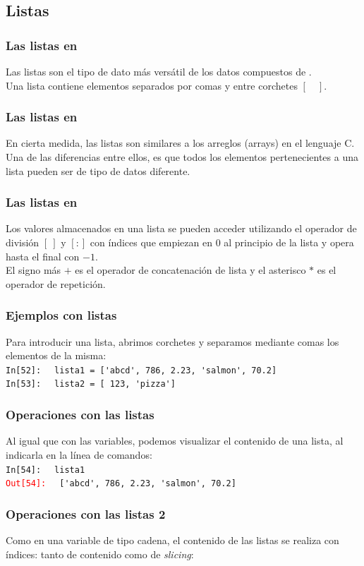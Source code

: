 \documentclass[12pt]{beamer}
\begin{document}
{\subsection{Listas}
\begin{frame}
\frametitle{Las listas en \python}
Las listas son el tipo de dato más versátil de los datos compuestos de \python.
\\
\bigskip
Una lista contiene elementos separados por comas y entre corchetes $[ \quad ]$.
\end{frame}
\begin{frame}
\frametitle{Las listas en \python}
En cierta medida, las listas son similares a los arreglos (arrays) en el lenguaje C.
\\
\bigskip
Una de las diferencias entre ellos, es que todos los elementos pertenecientes a una lista pueden ser de tipo de datos diferente.
\end{frame}
\begin{frame}
\frametitle{Las listas en \python}
Los valores almacenados en una lista se pueden acceder utilizando el operador de división $[ \: ]$ y $[:]$ con índices que empiezan en $0$ al principio de la lista y opera hasta el final con $-1$.
\\
\bigskip
El signo más $+$ es el operador de concatenación de lista y el asterisco $*$ es el operador de repetición.
\end{frame}
\begin{frame}[fragile]
\frametitle{Ejemplos con listas}
Para introducir una lista, abrimos corchetes y separamos mediante comas los elementos de la misma:
\\
\pause
\textcolor{ao}{\texttt{In[52]: }} \verb| lista1 = ['abcd', 786, 2.23, 'salmon', 70.2]|
\\
\textcolor{ao}{\texttt{In[53]: }} \verb| lista2 = [ 123, 'pizza']|
\end{frame}
\begin{frame}[fragile]
\frametitle{Operaciones con las listas}
Al igual que con las variables, podemos visualizar el contenido de una lista, al indicarla en la línea de comandos:
\\
\bigskip
\textcolor{ao}{\texttt{In[54]: }} \verb| lista1|
\\
\pause
\textcolor{red}{\texttt{Out[54]: }} \verb| ['abcd', 786, 2.23, 'salmon', 70.2]|
\end{frame}
\begin{frame}[fragile]
\frametitle{Operaciones con las listas 2}
Como en una variable de tipo cadena, el contenido de las listas se realiza con índices: tanto de contenido como de \emph{slicing}:

\end{frame}}
\end{document}
